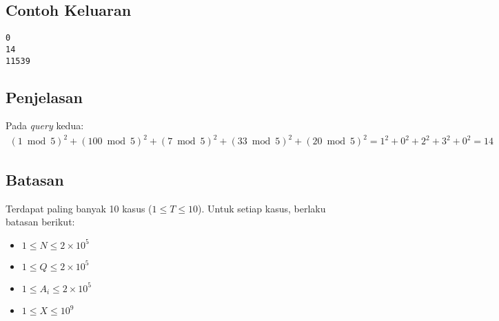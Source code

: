 \documentclass{article}
\begin{document}
\subsection*{Contoh Keluaran}
\begin{lstlisting}
0
14
11539
\end{lstlisting}

\subsection*{Penjelasan}

\par Pada \textit{query} kedua:
\begin{gather*} 
(1 \bmod 5)^2 + (100 \bmod 5)^2 + (7 \bmod 5)^2 + (33 \bmod 5)^2 + (20 \bmod 5)^2 = 1^2 + 0^2 + 2^2 + 3^2 + 0^2 = 14
\end{gather*} 

\subsection*{Batasan}

\par Terdapat paling banyak 10 kasus ($1 \leq T\leq 10$). Untuk setiap kasus, berlaku batasan berikut:
\begin{itemize}
	\item $1 \leq N\leq 2\times 10^5$
	\item $1 \leq Q\leq 2\times 10^5$
	\item $1 \leq A_i\leq 2\times 10^5$
	\item $1 \leq X \leq 10^9$
\end{itemize}
\end{document}
